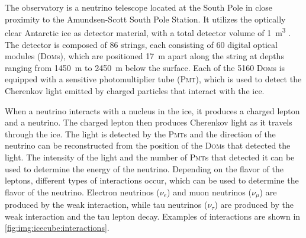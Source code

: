 \section{\icecube}
The \icecube observatory is a neutrino telescope located at the South Pole
in close proximity to the Amundsen-Scott South Pole Station.
It utilizes the optically clear Antarctic ice as detector material,
  with a total detector volume of \SI{1}{\cubic\meter} \cite{icecube_facts}.
The detector is composed of \num{86} strings,
  each consisting of \num{60} digital optical modules (\textsc{Dom}s),
    which are positioned
      \SI{17}{\meter} apart along the string
      at depths ranging from \SI{1450}{\meter} to \SI{2450}{\meter} below the surface.
Each of the \num{5160} \textsc{Dom}s is equipped with a sensitive photomultiplier tube (\textsc{Pmt}),
  which is used to detect the Cherenkov light emitted by charged particles
  that interact with the ice.



When a neutrino interacts with a nucleus in the ice,
it produces a charged lepton and a neutrino.
The charged lepton then produces Cherenkov light
  as it travels through the ice.
The light is detected by the \textsc{Pmt}s
  and the direction of the neutrino can be reconstructed
  from the position of the \textsc{Dom}s that detected the light.
The intensity of the light and the number of \textsc{Pmt}s that detected it
  can be used to determine the energy of the neutrino.
Depending on the flavor of the leptons,
  different types of interactions occur,
  which can be used to determine the flavor of the neutrino.
Electron neutrinos ($\nu_e$) and muon neutrinos ($\nu_\mu$) are produced by the weak interaction,
  while tau neutrinos ($\nu_\tau$) are produced by the weak interaction
  and the tau lepton decay.
Examples of interactions are shown in \autoref{fig:img:icecube:interactions}.



